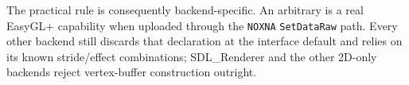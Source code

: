 The practical rule is consequently backend-specific. An arbitrary
 is a real EasyGL+ capability when uploaded
through the \texttt{NOXNA} \texttt{SetDataRaw} path. Every other backend still discards that
declaration at the interface default and relies on its known stride/effect combinations;
SDL\_Renderer and the other 2D-only backends reject vertex-buffer construction outright.

